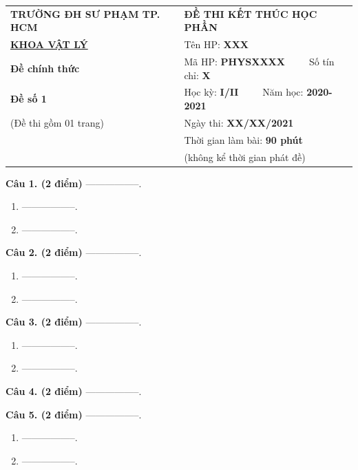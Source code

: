 \documentclass[13pt]{article}
\begin{document}
\pagestyle{empty}
\fontsize{13}{18}\selectfont

\begin{longtable}{p{5cm}p{2cm}p{8cm}}
\centerline{\bf TRƯỜNG ĐH SƯ PHẠM TP. HCM}&&\centerline{{\bf ĐỀ THI KẾT THÚC HỌC PHẦN}}\\
\centerline{\bf \underline{KHOA VẬT LÝ}}&&Tên HP: {\bf XXX}\\
\centerline{\bf Đề chính thức}&&Mã HP: {\bf PHYSXXXX}~~~~~Số tín chỉ: {\bf X}\\
\centerline{\bf Đề số 1}&&Học kỳ: {\bf I/II}~~~~~Năm học: {\bf 2020-2021}\\
\centerline{(Đề thi gồm 01 trang)}&&Ngày thi: \textbf{XX/XX/2021} \\
&&Thời gian làm bài: {\bf 90 phút}\\
&&\centerline{(không kể thời gian phát đề)}\\
\end{longtable}

\vspace*{0.5cm}

{\bf Câu 1. (2 điểm)} -----------------.

\begin{enumerate}[label=\alph*.]
\item -----------------. 
\item -----------------. 
\end{enumerate}

{\bf Câu 2. (2 điểm)} -----------------.

\begin{enumerate}[label=\alph*.]
\item -----------------. 
\item -----------------. 
\end{enumerate}

{\bf Câu 3. (2 điểm)} -----------------.

\begin{enumerate}[label=\alph*.]
\item -----------------. 
\item -----------------. 
\end{enumerate}


{\bf Câu 4. (2 điểm)} -----------------.

{\bf Câu 5. (2 điểm)} -----------------.

\begin{enumerate}[label=\alph*.]
\item -----------------. 
\item -----------------. 
\end{enumerate}
\end{document}
